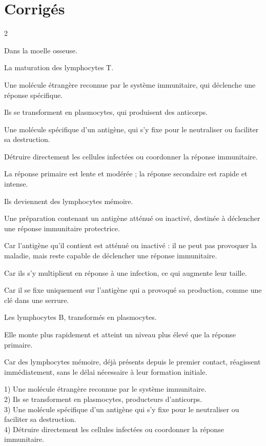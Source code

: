 \section{Corrigés}
\begin{multicols}{2}

Dans la moelle osseuse.

La maturation des lymphocytes T.

Une molécule étrangère reconnue par le système immunitaire, qui déclenche une réponse
spécifique.

Ils se transforment en plasmocytes, qui produisent des anticorps.

Une molécule spécifique d'un antigène, qui s'y fixe pour le neutraliser ou faciliter sa
destruction.

Détruire directement les cellules infectées ou coordonner la réponse immunitaire.

La réponse primaire est lente et modérée ; la réponse secondaire est rapide et intense.

Ils deviennent des lymphocytes mémoire.

Une préparation contenant un antigène atténué ou inactivé, destinée à déclencher une
réponse immunitaire protectrice.

Car l'antigène qu'il contient est atténué ou inactivé : il ne peut pas provoquer la
maladie, mais reste capable de déclencher une réponse immunitaire.

Car ils s'y multiplient en réponse à une infection, ce qui augmente leur taille.

Car il se fixe uniquement sur l'antigène qui a provoqué sa production, comme une clé dans
une serrure.

Les lymphocytes B, transformés en plasmocytes.

Elle monte plus rapidement et atteint un niveau plus élevé que la réponse primaire.

Car des lymphocytes mémoire, déjà présents depuis le premier contact, réagissent
immédiatement, sans le délai nécessaire à leur formation initiale.

1) Une molécule étrangère reconnue par le système immunitaire.\\
2) Ils se transforment en plasmocytes, producteurs d'anticorps.\\
3) Une molécule spécifique d'un antigène qui s'y fixe pour le neutraliser ou faciliter
sa destruction.\\
4) Détruire directement les cellules infectées ou coordonner la réponse immunitaire.


\end{multicols}
